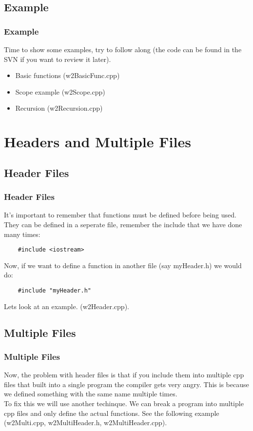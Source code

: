 \documentclass{beamer}
\begin{document}
\subsection{Example}

\begin{frame}[fragile]
	\frametitle{Example}
	Time to show some examples, try to follow along (the code can 
	be found in the SVN if you want to review it later). \\
	\begin{itemize}
		\item Basic functions (w2BasicFunc.cpp)
		\item Scope example (w2Scope.cpp)
		\item Recursion (w2Recursion.cpp)
	\end{itemize}
\end{frame}

\section{Headers and Multiple Files}

\subsection{Header Files}

\begin{frame}[fragile]
	\frametitle{Header Files}
	It's important to remember that functions must be defined before being used.
	They can be defined in a seperate file, remember the include that we have done
	many times:
	\begin{lstlisting}
	#include <iostream>
	\end{lstlisting}
	Now, if we want to define a function in another file (say myHeader.h) we would do:
	\begin{lstlisting}
	#include "myHeader.h"
	\end{lstlisting}
	Lets look at an example. (w2Header.cpp).
\end{frame}

\subsection{Multiple Files}

\begin{frame}[fragile]
	\frametitle{Multiple Files}
	Now, the problem with header files is that if you include them into multiple cpp files
	that built into a single program the compiler gets very angry. This is because we defined
	something with the same name multiple times. \\
	To fix this we will use another techinque. We can break a program into multiple cpp files 
	and only define the actual functions. See the following example (w2Multi.cpp, 
	w2MultiHeader.h, w2MultiHeader.cpp).
\end{frame}
\end{document}
